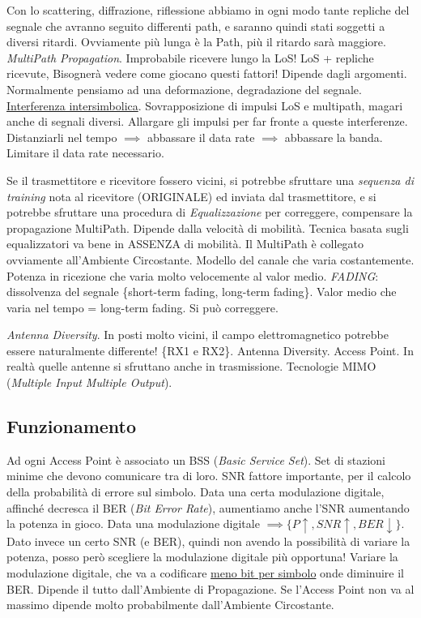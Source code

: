 Con lo scattering, diffrazione, riflessione abbiamo in ogni modo tante repliche del segnale che avranno seguito differenti path, e saranno quindi stati soggetti a diversi ritardi. Ovviamente più lunga è la Path, più il ritardo sarà maggiore. \textit{MultiPath Propagation}. Improbabile ricevere lungo la LoS! LoS + repliche ricevute, Bisognerà vedere come giocano questi fattori! Dipende dagli argomenti. Normalmente pensiamo ad una deformazione, degradazione del segnale. \underline{Interferenza intersimbolica}. Sovrapposizione di impulsi LoS e multipath, magari anche di segnali diversi. Allargare gli impulsi per far fronte a queste interferenze. Distanziarli nel tempo $\implies$ abbassare il data rate $\implies$ abbassare la banda. Limitare il data rate necessario.

Se il trasmettitore e ricevitore fossero vicini, si potrebbe sfruttare una \textit{sequenza di training} nota al ricevitore (ORIGINALE) ed inviata dal trasmettitore, e si potrebbe sfruttare una procedura di \textit{Equalizzazione} per correggere, compensare la propagazione MultiPath. Dipende dalla velocità di mobilità. Tecnica basata sugli equalizzatori va bene in ASSENZA di mobilità. Il MultiPath  è collegato ovviamente all'Ambiente Circostante. Modello del canale che varia costantemente. Potenza in ricezione che varia molto velocemente al valor medio. \textit{FADING}: dissolvenza del segnale \{short-term fading, long-term fading\}. Valor medio che varia nel tempo = long-term fading. Si può correggere.

\textit{Antenna Diversity}. In posti molto vicini, il campo elettromagnetico potrebbe essere naturalmente differente! \{RX1 e RX2\}. Antenna Diversity. Access Point. In realtà quelle antenne si sfruttano anche in trasmissione. Tecnologie MIMO (\textit{Multiple Input Multiple Output}).

\subsection{Funzionamento}

Ad ogni Access Point è associato un BSS (\textit{Basic Service Set}). Set di stazioni minime che devono comunicare tra di loro. SNR fattore importante, per il calcolo della probabilità di errore sul simbolo. Data una certa modulazione digitale, affinché decresca il BER (\textit{Bit Error Rate}), aumentiamo anche l'SNR aumentando la potenza in gioco. Data una modulazione digitale $\implies \{P\uparrow, SNR\uparrow, BER\downarrow\}$. Dato invece un certo SNR (e BER), quindi non avendo la possibilità di variare la potenza, posso però scegliere la modulazione digitale più opportuna! Variare la modulazione digitale, che va a codificare \underline{meno bit per simbolo} onde diminuire il BER. Dipende il tutto dall'Ambiente di Propagazione. Se l'Access Point non va al massimo dipende molto probabilmente dall'Ambiente Circostante.

